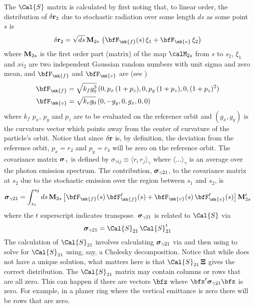 The $\Cal{S}$ matrix is calculated by first noting that, to linear order, the distribution of
$\delta{\bf r}_2$ due to stochastic radiation over some length $ds$ as some point $s$ is
\begin{equation}
  \delta\bfr_2 = \sqrt{ds} \, \bfM_{2s} \, \left( \bfF_\mk{f}(s) \, \xi_1 + \bfF_\mk{v} \, \xi_2 \right)
\end{equation}
where ${\bf M}_{2s}$ is the first order part (matrix) of the map $\calM_{2s}$ from $s$ to $s_2$,
$\xi_1$ and $xi_2$ are two independent Gaussian random numbers with unit sigma and zero mean, and
$\bfF_\mk{f}$ and $\bfF_\mk{v}$ are (see )
\begin{align}
  \bfF_\mk{f} &= \sqrt{k_f g_0^3} \, (0, p_x \, (1 + p_z), 0, p_y \, (1 + p_z), 0, (1 + p_z)^2) \\
  \bfF_\mk{v} &= \sqrt{k_v g_0} \, (0, -g_y, 0, g_x, 0, 0)
  \label{fk000}
\end{align}
where $k_f$ $p_x$, $p_y$ and $p_z$ are to be evaluated on the reference orbit and $(g_x, g_y)$ is the
curvature vector which points away from the center of curvature of the particle's orbit. Notice that since
$\delta{\bf r}$ is, by definition, the deviation from the reference orbit, $p_x = r_2$ and $p_y = r_4$
will be zero on the reference orbit. The covariance matrix ${\boldsymbol{\sigma}}_\gamma$ is defined by
$\sigma_{\gamma ij} \equiv \langle r_i \, r_j \rangle_\gamma$ where $\langle \ldots \rangle_\gamma$
is an average over the photon emission spectrum. The contribution, ${\boldsymbol{\sigma}}_{\gamma21}$, to the
covariance matrix at $s_2$ due to the stochastic emission over the region between $s_1$ and $s_2$,
is
\begin{equation}
  \bfsig_{\gamma21} = \int_{s_1}^{s_2} ds \, 
    \bfM_{2s} \, \big[ 
    \bfF_\mk{f}(s) \, \bfF_\mk{f}^t(s) + \bfF_\mk{v}(s) \, \bfF_\mk{v}^t(s) \big] \, \bfM_{2s}^t
  \label{smvvm}
\end{equation}
where the $t$ superscript indicates transpose. ${\boldsymbol{\sigma}}_{\gamma21}$ is related to $\Cal{S}$ via
\begin{equation}
  \bfsig_{\gamma21} = \Cal{S}_{21} \, \Cal{S}_{21}^t
  \label{sxx}
\end{equation}
The calculation of $\Cal{S}_{21}$ involves calculating ${\boldsymbol{\sigma}}_{\gamma21}$ via  and then
using  to solve for $\Cal{S}_{21}$ using, say, a Cholesky decomposition. Notice that while
 does not have a unique solution, what matters here is that $\Cal{S}_{21} \, \Bf\Xi$ gives
the correct distribution. The $\Cal{S}_{21}$ matrix may contain columns or rows that are all
zero. This can happen if there are vectors $\bfz$ where $\bfz^t \bfsig_{\gamma21} \bfz$ is zero. For
example, in a planer ring where the vertical emittance is zero there will be rows that are zero.

